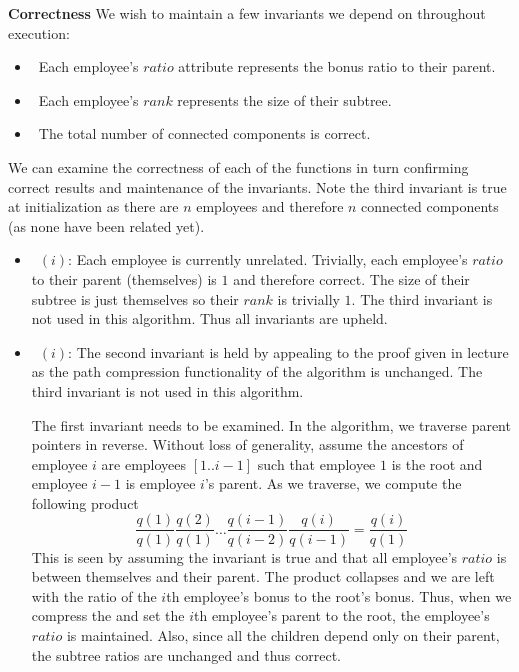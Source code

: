 \documentclass[12pt,twoside]{article}
\begin{document}
\begin{problems}
\textbf{Correctness} We wish to maintain a few invariants we depend on 
throughout execution:

\begin{itemize}
    \item\ Each employee's $ratio$ attribute represents the bonus ratio to 
    their parent.
    \item\ Each employee's $rank$ represents the size of their subtree.
    \item\ The total number of connected components is correct.
\end{itemize}

We can examine the correctness of each of the functions in turn confirming
correct results and maintenance of the invariants. Note the third invariant
is true at initialization as there are $n$ employees and therefore $n$ 
connected components (as none have been related yet).

\begin{itemize}
    \item\ $(i)$: Each employee is currently unrelated.
        Trivially, each employee's $ratio$ to their parent (themselves) is
        $1$ and therefore correct. The size of their subtree is just
        themselves so their $rank$ is trivially $1$. The third invariant is 
        not used in this algorithm. Thus all invariants are upheld. 
    \item\ $(i)$: The second invariant is held by appealing to
        the proof given in lecture as the path compression functionality of the
        algorithm is unchanged. The third invariant is not used in this algorithm.
        
        The first invariant needs to be examined. In 
        the algorithm, we traverse parent pointers in reverse. Without loss of 
        generality, assume the ancestors of employee $i$ are employees $[1..i 
        - 1]$ such that employee $1$ is the root and employee $i - 1$ is employee
        $i$'s parent. As we traverse, we compute the following product
        $$ \frac{q(1)}{q(1)} \frac{q(2)}{q(1)} \ldots \frac{q(i - 1)}{q(i - 2)} 
        \frac{q(i)}{q(i - 1)} = \frac{q(i)}{q(1)} $$
        This is seen by assuming the invariant is true and that all employee's
        $ratio$ is between themselves and their parent. The product collapses
        and we are left with the ratio of the $i$th employee's bonus to the 
        root's bonus. Thus, when we compress the and set the $i$th employee's
        parent to the root, the employee's $ratio$ is maintained. Also, since
        all the children depend only on their parent, the subtree ratios are
        unchanged and thus correct.
        

\end{itemize}
\end{problems}
\end{document}
